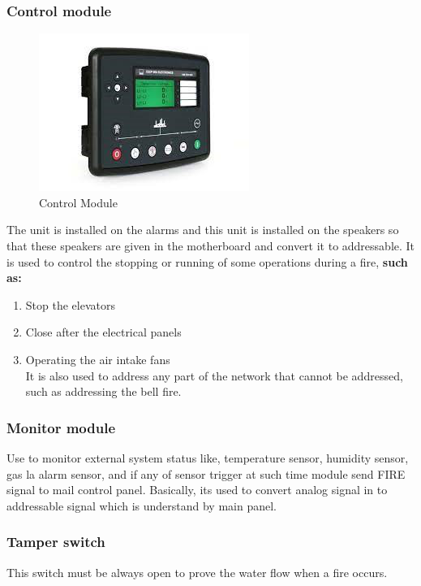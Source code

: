 \documentclass[12pt,fleqn]{book} %
\begin{document}
\subsubsection{Control module}
 \begin{figure}[!h]
    \centering
    \includegraphics[width=0.5\linewidth]{hamdy 40.png}
    \caption{Control Module}
    \label{fig:hamdy 40}
\end{figure}
The unit is installed on the alarms and this unit is installed on the speakers so that these speakers are given in the motherboard and convert it to addressable. It is used to control the stopping or running of some operations during a fire, \textbf{such as:}
\begin{enumerate}
    \item Stop the elevators
    \item Close after the electrical panels
    \item Operating the air intake fans
    \\ It is also used to address any part of the network that cannot be addressed, such as addressing the bell fire.
    \end{enumerate}
    \subsubsection{Monitor module}
    Use to monitor external system status like, temperature sensor, humidity sensor, gas la alarm sensor, and if any of sensor trigger at such time module send FIRE signal to mail control panel. Basically, its used to convert analog signal in to addressable signal which is understand by main panel.
    \subsubsection{Tamper switch}
    This switch must be always open to prove the water flow when a fire occurs.
\end{document}
